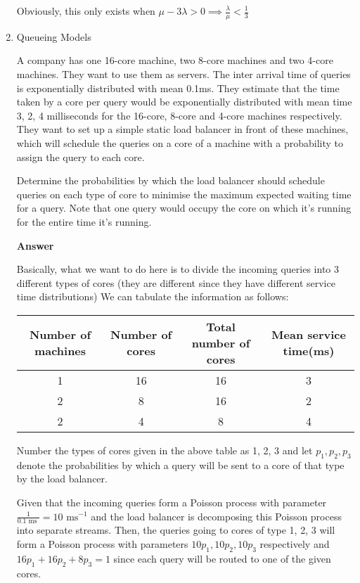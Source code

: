 \documentclass[12pt, oneside]{article}
\begin{document}
\begin{enumerate}
{    Obviously, this only exists when \(\mu - 3\lambda > 0 \implies \frac{\lambda}{\mu} < \frac{1}{3}\)
}

\item {
    Queueing Models

    A company has one 16-core machine, two 8-core machines and two 4-core machines. They want
    to use them as servers. The inter arrival time of queries is exponentially distributed
    with mean 0.1ms. They estimate that the time taken by a core per query
    would be exponentially distributed with mean time 3, 2, 4 milliseconds for the 16-core,
    8-core and 4-core machines respectively. They want to set up a simple static load 
    balancer in front of these machines, which will schedule the queries on a core of a 
    machine with a probability to assign the query to each core.

    Determine the probabilities by which the load balancer should schedule queries on each
    type of core to minimise the maximum expected waiting time for a query. Note that one 
    query would occupy the core on which it's running for the entire time it's running.

    \textbf{Answer}

    Basically, what we want to do here is to divide the incoming queries into 3 different
    types of cores (they are different since they have different service time distributions)
    We can tabulate the information as follows:

    \begin{center}
        \begin{tabular}{| c | c | c | c |}
            \hline
            Number of machines & Number of cores & Total number of cores & Mean service time(ms) \\
            \hline
            1 & 16 & 16 & 3 \\
            2 & 8 & 16 & 2 \\
            2 & 4 & 8 & 4 \\
            \hline
        \end{tabular}
    \end{center}

    Number the types of cores given in the above table as 1, 2, 3 and let \(p_1, p_2, p_3\)
    denote the probabilities by which a query will be sent to a core of that type by the load
    balancer.

    Given that the incoming queries form a Poisson process with parameter 
    \(\frac{1}{0.1 \text{ ms }} = 10 \text{ ms}^{-1}\) and the load balancer is decomposing
    this Poisson process into separate streams. Then, the queries going to cores of type
    1, 2, 3 will form a Poisson process with parameters \(10p_1, 10p_2, 10p_3\) respectively
    and \(16p_1 + 16p_2 + 8p_3 = 1\) since each query will be routed to one of the given
    cores.

}
\end{enumerate}
\end{document}
